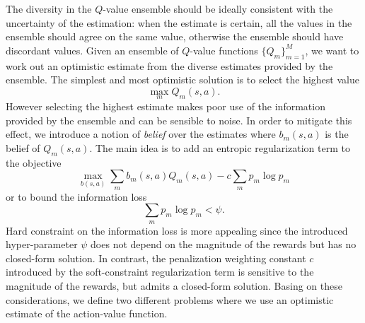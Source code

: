 The diversity in the $Q$-value ensemble should be ideally consistent with the uncertainty of the estimation: when the estimate is certain, all the values in the ensemble should agree on the same value, otherwise the ensemble should have discordant values.
Given an ensemble of $Q$-value functions $\{Q_m\}_{m=1}^M$, we want to work out an optimistic estimate from the diverse estimates provided by the ensemble. The simplest and most optimistic solution is to select the highest value
\begin{equation}
 \max_m Q_m(s,a).
\end{equation}
However selecting the highest estimate makes poor use of the information provided by the ensemble and can be sensible to noise. In order to mitigate this effect, we introduce a notion of \textit{belief} over the estimates where $b_m(s,a)$ is the belief of $Q_m(s,a)$. The main idea is to add an entropic regularization term to the objective
\begin{equation}
 \max_{b(s,a)} \sum_m b_m(s,a) Q_m(s,a) - c \sum_{m} p_m \log p_m
\end{equation}
or to bound the information loss
\begin{equation}
\sum_m p_m \log p_m < \psi.
\end{equation}
Hard constraint on the information loss is more appealing since the introduced hyper-parameter $\psi$ does not depend on the magnitude of the rewards but has no closed-form solution. In contrast, the penalization weighting constant $c$ introduced by the soft-constraint regularization term is sensitive to the magnitude of the rewards, but admits a closed-form solution.
Basing on these considerations, we define two different problems where we use an optimistic estimate of the action-value function.

